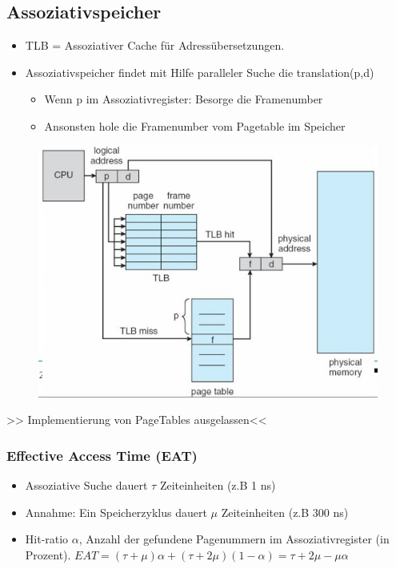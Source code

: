 \documentclass[a4paper]{scrreprt}
\begin{document}
\subsection{Assoziativspeicher}
\begin{itemize}
\item TLB = Assoziativer Cache für Adressübersetzungen.
\item Assoziativspeicher findet mit Hilfe paralleler Suche die translation(p,d)
\begin{itemize}
\item Wenn p im Assoziativregister: Besorge die Framenumber
\item Ansonsten hole die Framenumber vom Pagetable im Speicher
\end{itemize}
\end{itemize}
\begin{figure}[ht]
\centering
\includegraphics[scale=0.40]{graphics/tlb.png}
\end{figure}


>> Implementierung von PageTables ausgelassen<<
\subsubsection{Effective Access Time (EAT)}
\begin{itemize}
\item Assoziative Suche dauert $\tau$ Zeiteinheiten (z.B 1 ns)
\item Annahme: Ein Speicherzyklus dauert $\mu$ Zeiteinheiten (z.B 300 ns)
\item Hit-ratio $\alpha$, Anzahl der gefundene Pagenummern im Assoziativregister (in Prozent). 
$EAT = (\tau + \mu)  \alpha + (\tau + 2\mu) (1-\alpha) = \tau +2\mu - \mu\alpha$
\end{itemize}
\end{document}
